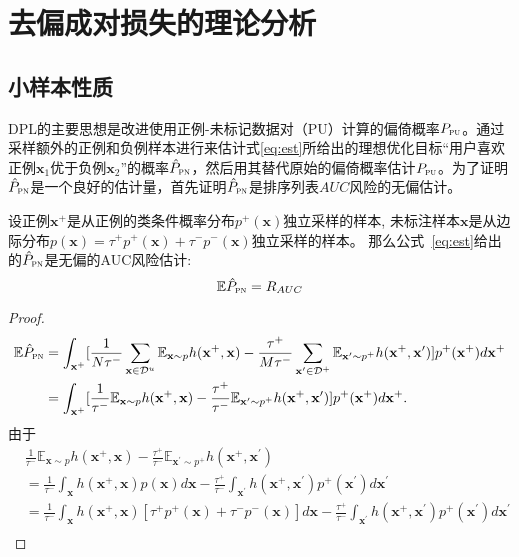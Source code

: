\section{去偏成对损失的理论分析}\label{2sec:5}
\subsection{小样本性质}
DPL的主要思想是改进使用正例-未标记数据对（PU）计算的偏倚概率$P_\textsc{pu}$。通过采样额外的正例和负例样本进行来估计式\eqref{eq:est}所给出的理想优化目标“用户喜欢正例$\mathbf{x}_1$优于负例$\mathbf{x}_2$”的概率$\hat P_\textsc{pn}$，然后用其替代原始的偏倚概率估计$P_\textsc{pu}$。为了证明$\hat P_\textsc{pn}$是一个良好的估计量，首先证明$\hat P_\textsc{pn}$是排序列表$AUC$风险的无偏估计。
\begin{lemma}\label{lemma:auc} 设正例$\mathbf{x}^+$是从正例的类条件概率分布$p^+(\mathbf{x})$独立采样的样本, 未标注样本$\mathbf{x}$是从边际分布$p(\mathbf{x}) = \tau^+ p^+(\mathbf{x})+ \tau^- p^-(\mathbf{x})$独立采样的样本。 那么公式~\eqref{eq:est}给出的$\hat P_\textsc{pn}$是无偏的AUC风险估计:
	\[\mathbb{E}\hat P_\textsc{pn} = R_{AUC}\]
	\begin{proof}
		\begin{align}
			\mathbb{E}\hat P_\textsc{pn} &=\int_{\mathbf{x}^+} [\frac{1}{N\tau^-}
			\sum_{\mathbf{x} \in \mathcal{D}^u} \mathbb{E}_{\mathbf{x}\sim p}h(\mathbf{x}^+,\mathbf{x}) - \frac{\tau^+}{M\tau^-}\sum_{\mathbf{x}^\prime\in \mathcal{D}^+}\mathbb{E}_{\mathbf{x}^\prime \sim p^+}h(\mathbf{x}^+, \mathbf{x}^\prime)]p^+(\mathbf{x}^+)d\mathbf{x}^+ \\
			&=\int_{\mathbf{x}^+} [\frac{1}{\tau^-}
			\mathbb{E}_{\mathbf{x}\sim p}h(\mathbf{x}^+,\mathbf{x}) - \frac{\tau^+}{\tau^-}\mathbb{E}_{\mathbf{x}^\prime \sim p^+}h(\mathbf{x}^+, \mathbf{x}^\prime)]p^+(\mathbf{x}^+)d\mathbf{x}^+ \label{eq:unbiasauc}.
		\end{align}
由于
		\begin{align}
			&\frac{1}{\tau^-}\mathbb{E}_{\mathbf{x}\sim p}h(\mathbf{x}^+,\mathbf{x}) - \frac{\tau^+}{\tau^-}\mathbb{E}_{\mathbf{x}^\prime\sim p^+}h(\mathbf{x}^+, \mathbf{x}^\prime)\nonumber \\
			&=\frac{1}{\tau^-} \int_\mathbf{x}h(\mathbf{x}^+,\mathbf{x})p(\mathbf{x})d\mathbf{x} - \frac{\tau^+}{\tau^-} \int_\mathbf{x^\prime}h(\mathbf{x}^+, \mathbf{x}^\prime)p^+(\mathbf{x}^\prime)d\mathbf{x^\prime} \nonumber \\
			&=\frac{1}{\tau^-} \int_\mathbf{x}h(\mathbf{x}^+,\mathbf{x})[\tau^+p^+(\mathbf{x}) + \tau^-p^-(\mathbf{x}) ]d\mathbf{x} - \frac{\tau^+}{\tau^-} \int_\mathbf{x^\prime}h(\mathbf{x}^+, \mathbf{x}^\prime)p^+(\mathbf{x}^\prime)d\mathbf{x^\prime}  \label{eq:marginal} \\

\end{align}
\end{proof}
\end{lemma}
